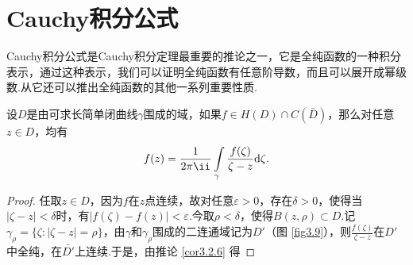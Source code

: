 \section{Cauchy积分公式\label{sec3.4}}
Cauchy积分公式是Cauchy积分定理最重要的推论之一，它是全纯函数的一种积分表示，通过这种表示，我们可以证明全纯函数有任意阶导数，而且可以展开成幂级数.从它还可以推出全纯函数的其他一系列重要性质.
\begin{theorem}\label{thm3.4.1}
设$D$是由可求长简单闭曲线$\gamma$围成的域，如果$f\in H(D)\cap C(\bar D)$，那么对任意$z\in D$，均有
\begin{equation}\label{eq3.4.1}
  f(z)=\frac1{2\pi\ii}\int\limits_\gamma\frac{f(\zeta)}{\zeta-z}\textrm d\zeta.
\end{equation}
\end{theorem}
\begin{proof}
任取$z\in D$，因为$f$在$z$点连续，故对任意$\varepsilon>0$，存在$\delta>0$，使得当$|\zeta-z|<\delta$时，有$|f(\zeta)-f(z)|<\varepsilon$.今取$\rho<\delta$，使得$B(z,\rho)\subset D$.记$\gamma_\rho=\{\zeta:|\zeta-z|=\rho\}$，由$\gamma$和$\gamma_{\rho}$围成的二连通域记为$D'$（图 \ref{fig3.9}），则$\frac{f(\zeta)}{\zeta-z}$在$D'$中全纯，在$\bar {D'}$上连续.于是，由推论 \ref{cor3.2.6} 得


\end{proof}
